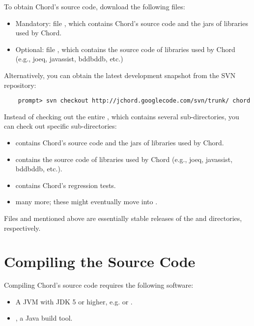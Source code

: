 To obtain Chord's source code, download the following files:

\begin{itemize}
\item
Mandatory: file , which contains Chord's source code and the jars of libraries used by Chord.
\item
Optional: file , which contains the source
code of libraries used by Chord (e.g., joeq, javassist, bddbddb, etc.)
\end{itemize}

Alternatively, you can obtain the latest development snapshot from the SVN repository:

\begin{verbatim}
    prompt> svn checkout http://jchord.googlecode.com/svn/trunk/ chord
\end{verbatim}

Instead of checking out the entire , which contains several sub-directories, you can check out
specific sub-directories:

\begin{itemize}
\item
{} contains Chord's source code and the jars of libraries used by Chord.
\item
{} contains the source code of libraries used by Chord (e.g., joeq, javassist, bddbddb, etc.).
\item
{} contains Chord's regression tests.
\item
many more; these might eventually move into .
\end{itemize}

Files  and  mentioned above are essentially stable releases of
the  and  directories, respectively. 

\section{Compiling the Source Code}
\label{sec:compiling-sources}

Compiling Chord's source code requires the following software:

\begin{itemize}
\item
A JVM with JDK 5 or higher, e.g.  or
.
\item
{}, a Java build tool.
\end{itemize}

